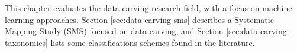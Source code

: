 This chapter evaluates the data carving research field, with a focus on machine learning approaches. Section \ref{sec:data-carving-sms} describes a Systematic Mapping Study (SMS) focused on data carving, and Section \ref{sec:data-carving-taxonomies} lists some classifications schemes found in the literature.

% 
% 


